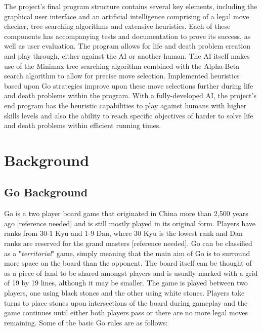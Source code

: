 \documentclass{l3proj}
\begin{document}
The project's final program structure contains several key elements, including the graphical user interface and an artificial intelligence comprising of a legal move checker, tree searching algorithms and extensive heuristics. Each of these components has accompanying tests and documentation to prove its success, as well as user evaluation. The program allows for life and death problem creation and play through, either against the AI or another human. The AI itself makes use of the Minimax tree searching algorithm combined with the Alpha-Beta search algorithm to allow for precise move selection. Implemented heuristics based upon Go strategies improve upon these move selections further during life and death problems within the program. With a fully-developed AI, the project's end program has the heuristic capabilities to play against humans with higher skills levels and also the ability to reach specific objectives of harder to solve life and death problems within efficient running times.

\chapter{Background}
\label{background}

\section{Go Background}

Go is a two player board game that originated in China more than 2,500 years ago [reference needed] and is still mostly played in its original form.  Players have ranks from 30-1 Kyu and 1-9 Dan, where 30 Kyu is the lowest rank and Dan ranks are reserved for the grand masters [reference needed]. Go can be classified as a "\textit{territorial}" game, simply meaning that the main aim of Go is to surround more space on the board than the opponent. The board itself can be thought of as a piece of land to be shared amongst players and is usually marked with a grid of 19 by 19 lines, although it may be smaller. The game is played between two players, one using black stones and the other using white stones. Players take turns to place stones upon intersections of the board during gameplay and the game continues until either both players pass or there are no more legal moves remaining.  Some of the basic Go rules are as follows:
\end{document}
